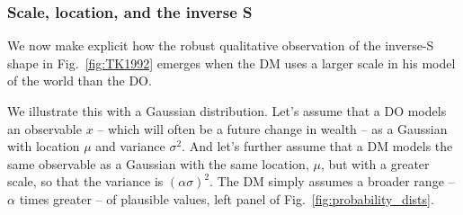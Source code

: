 \documentclass[a4paper, 12pt]{article}
\newcommand{\fref}[1]{Fig.~\ref{fig:#1}}
\newcommand{\secref}[1]{Sec.~\ref{sec:#1}}
\begin{document}
\subsubsection{Scale, location, and the inverse S}
We now make explicit how the robust qualitative observation of the inverse-S shape in \fref{TK1992} emerges when the DM uses a larger scale in his model of the world than the DO. 

We illustrate this with a Gaussian distribution.
Let's assume that a DO models an observable $x$ -- which will often be a future change in wealth -- as a Gaussian with location $\mu$ and variance $\sigma^2$. And let's further assume that a DM 
models the same observable as a Gaussian with the same location, $\mu$, but with a greater scale, so that the variance is $(\alpha\sigma)^2$. The DM simply assumes a broader range -- $\alpha$ times greater -- of plausible values, left panel of \fref{probability_dists}.
\end{document}
